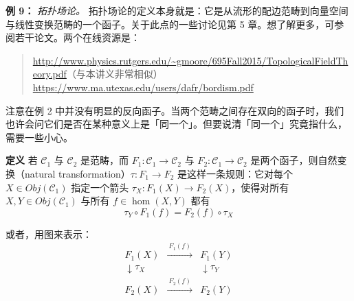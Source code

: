 \textbf{例 9：} \textit{拓扑场论。} 拓扑场论的定义本身就是：它是从流形的配边范畴到向量空间与线性变换范畴的一个函子。关于此点的一些讨论见第 5 章。想了解更多，可参阅若干论文。两个在线资源是：

\begin{quote}
\url{http://www.physics.rutgers.edu/~gmoore/695Fall2015/TopologicalFieldTheory.pdf}（与本讲义非常相似）\\
\url{https://www.ma.utexas.edu/users/dafr/bordism.pdf}
\end{quote}

注意在例 2 中并没有明显的反向函子。当两个范畴之间存在双向的函子时，我们也许会问它们是否在某种意义上是「同一个」。但要说清「同一个」究竟指什么，需要一些小心。


\textbf{定义} 若 $\mathcal{C}_1$ 与 $\mathcal{C}_2$ 是范畴，而 $F_1:\mathcal{C}_1\to\mathcal{C}_2$ 与 $F_2:\mathcal{C}_1\to\mathcal{C}_2$ 是两个函子，则自然变换（natural transformation）$\tau:F_1\to F_2$ 是这样一条规则：它对每个 $X\in\mathit{Obj}(\mathcal{C}_1)$ 指定一个箭头 $\tau_X:F_1(X)\to F_2(X)$，使得对所有 $X,Y\in\mathit{Obj}(\mathcal{C}_1)$ 与所有 $f\in\hom(X,Y)$ 都有
\begin{equation}
\tau_Y\circ F_1(f)=F_2(f)\circ\tau_X
\tag{K.23}
\label{eq:K.23}
\end{equation}

或者，用图来表示：
\begin{equation}
\begin{array}{ccc}
F_1(X) & \xrightarrow{\ F_1(f)\ } & F_1(Y)\\[2pt]
\downarrow\scriptstyle{\tau_X} & & \downarrow\scriptstyle{\tau_Y}\\[2pt]
F_2(X) & \xrightarrow{\ F_2(f)\ } & F_2(Y)
\end{array}
\tag{K.24}
\label{eq:K.24}
\end{equation}

